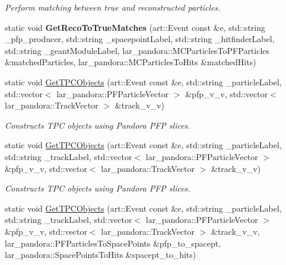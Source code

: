 \begin{DoxyCompactItemize}
\begin{DoxyCompactList}\small\item\em \-Perform matching between true and reconstructed particles. \end{DoxyCompactList}\item 
\hypertarget{classUBXSecHelper_a0bc1ff387b79732ea8d365ad296a22fb}{static void {\bfseries \-Get\-Reco\-To\-True\-Matches} (art\-::\-Event const \&e, std\-::string \-\_\-pfp\-\_\-producer, std\-::string \-\_\-spacepoint\-Label, std\-::string \-\_\-hitfinder\-Label, std\-::string \-\_\-geant\-Module\-Label, lar\-\_\-pandora\-::\-M\-C\-Particles\-To\-P\-F\-Particles \&matched\-Particles, lar\-\_\-pandora\-::\-M\-C\-Particles\-To\-Hits \&matched\-Hits)}\label{classUBXSecHelper_a0bc1ff387b79732ea8d365ad296a22fb}

\item 
static void \hyperlink{classUBXSecHelper_a36ef4a258300c98061cd01782157433b}{\-Get\-T\-P\-C\-Objects} (art\-::\-Event const \&e, std\-::string \-\_\-particle\-Label, std\-::vector$<$ lar\-\_\-pandora\-::\-P\-F\-Particle\-Vector $>$ \&pfp\-\_\-v\-\_\-v, std\-::vector$<$ lar\-\_\-pandora\-::\-Track\-Vector $>$ \&track\-\_\-v\-\_\-v)
\begin{DoxyCompactList}\small\item\em \-Constructs \-T\-P\-C objects using \-Pandora \-P\-F\-P slices. \end{DoxyCompactList}\item 
static void \hyperlink{classUBXSecHelper_a3cab5312a1b756505fe0fe1df779fdc4}{\-Get\-T\-P\-C\-Objects} (art\-::\-Event const \&e, std\-::string \-\_\-particle\-Label, std\-::string \-\_\-track\-Label, std\-::vector$<$ lar\-\_\-pandora\-::\-P\-F\-Particle\-Vector $>$ \&pfp\-\_\-v\-\_\-v, std\-::vector$<$ lar\-\_\-pandora\-::\-Track\-Vector $>$ \&track\-\_\-v\-\_\-v)
\begin{DoxyCompactList}\small\item\em \-Constructs \-T\-P\-C objects using \-Pandora \-P\-F\-P slices. \end{DoxyCompactList}\item 
static void \hyperlink{classUBXSecHelper_a2f4cbe3be1b4e4721d844c83258d6962}{\-Get\-T\-P\-C\-Objects} (art\-::\-Event const \&e, std\-::string \-\_\-particle\-Label, std\-::string \-\_\-track\-Label, std\-::vector$<$ lar\-\_\-pandora\-::\-P\-F\-Particle\-Vector $>$ \&pfp\-\_\-v\-\_\-v, std\-::vector$<$ lar\-\_\-pandora\-::\-Track\-Vector $>$ \&track\-\_\-v\-\_\-v, lar\-\_\-pandora\-::\-P\-F\-Particles\-To\-Space\-Points \&pfp\-\_\-to\-\_\-spacept, lar\-\_\-pandora\-::\-Space\-Points\-To\-Hits \&spacept\-\_\-to\-\_\-hits)

\end{DoxyCompactItemize}
